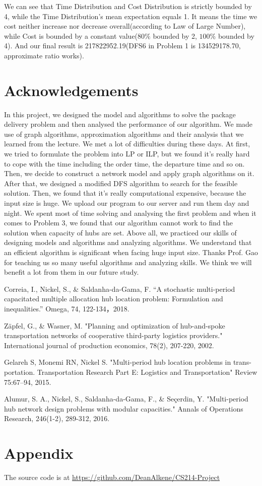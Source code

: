 \documentclass{llncs}
\begin{document}
We can see that Time Distribution and Cost Distribution is strictly bounded by 4, while the Time Distribution's mean expectation equals 1. It means the time we cost neither increase nor decrease overall(according to Law of Large Number), while Cost is bounded by a constant value($80\%$ bounded by 2, $100\%$ bounded by 4). And our final result is 217822952.19(DFS6 in Problem 1 is 134529178.70, approximate ratio works).

\section*{Acknowledgements}
In this project, we designed the model and algorithms to solve the package delivery problem and then analysed the performance of our algorithm. We made use of graph algorithms, approximation algorithms and their analysis that we learned from the lecture. We met a lot of difficulties during these days. At first, we tried to formulate the problem into LP or ILP, but we found it's really hard to cope with the time including the order time, the departure time and so on. Then, we decide to construct a network model and apply graph algorithms on it. After that, we designed a modified DFS algorithm to search for the feasible solution. Then, we found that it's really computational expensive, because the input size is huge. We upload our program to our server and run them day and night. We spent most of time solving and analysing the first problem and when it comes to Problem 3, we found that our algorithm cannot work to find the solution when capacity of hubs are set. Above all, we practiced our skills of designing models and algorithms and analyzing algorithms. We understand that an efficient algorithm is significant when facing huge input size. Thanks Prof. Gao for teaching us so many useful algorithms and analyzing skills. We think we will benefit a lot from them in our future study.

%
%
%
% 
% 
%
\newpage

\begin{thebibliography}{8}
Correia, I., Nickel, S., \& Saldanha-da-Gama, F. “A stochastic multi-period capacitated multiple allocation hub location problem: Formulation and inequalities.” Omega, 74, 122-134，2018.

Zäpfel, G., \& Wasner, M. "Planning and optimization of hub-and-spoke transportation networks of cooperative third-party logistics providers." International journal of production economics, 78(2), 207-220, 2002.

Gelareh S, Monemi RN, Nickel S. "Multi-period hub location problems in trans- portation. Transportation Research Part E: Logistics and Transportation" Review 75:67–94, 2015.

Alumur, S. A., Nickel, S., Saldanha-da-Gama, F., \& Seçerdin, Y. "Multi-period hub network design problems with modular capacities." Annals of Operations Research, 246(1-2), 289-312, 2016.
\end{thebibliography}
\section*{Appendix}
The source code is at \url{https://github.com/DeanAlkene/CS214-Project}
\end{document}
